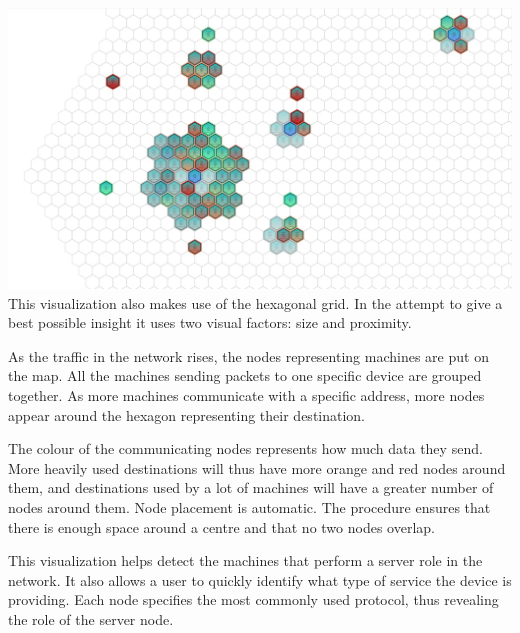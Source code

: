 \includegraphics[width=\linewidth]{materials/groups.jpg}
This visualization also makes use of the hexagonal grid. In the attempt to give
a best possible insight it uses two visual factors: size and proximity.

As the traffic in the network rises, the nodes representing machines are put on
the map. All the machines sending packets to one specific device are grouped
together. As more machines communicate with a specific address, more nodes
appear around the hexagon representing their destination.

The colour of the communicating nodes represents how much data they send. More
heavily used destinations will thus have more orange and red nodes around them,
and destinations used by a lot of machines will have a greater number of nodes
around them. Node placement is automatic. The procedure ensures that there is
enough space around a centre and that no two nodes overlap.

This visualization helps detect the machines that perform a server role in the
network. It also allows a user to quickly identify what type of service the device
is providing. Each node specifies the most commonly used protocol, thus
revealing the role of the server node.
